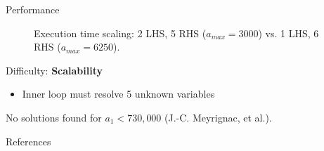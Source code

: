 \documentclass[]{beamer}
\begin{document}
\begin{frame}{Performance}

  \begin{figure}[h]
  \centering
  \caption{Execution time scaling: 2 LHS, 5 RHS ($a_{max}=3000$) vs. 1 LHS, 6 RHS ($a_{max}=\text{6250}$).}
  \label{fig:runtime_scaling}
  \end{figure}


  \pause Difficulty: \textbf{Scalability}

  \begin{itemize}
      \item Inner loop must resolve 5 unknown variables

  \end{itemize}
  \bigskip

  No solutions found for $a_1<730,000$ (J.-C. Meyrignac, et al.).
\end{frame}

\begin{frame}{References}
  \nocite{*}
  
  
\end{frame}
\end{document}
